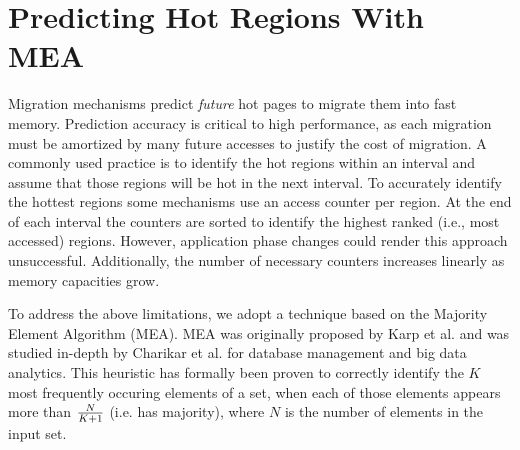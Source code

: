 
\section[Predicting Hot Regions With MEA]{Predicting Hot Regions With\\MEA}
\label{sec:MEA}


Migration mechanisms predict \textit{future} hot pages to migrate them into fast memory. Prediction accuracy is critical to high performance, as each migration must be amortized by many future accesses to justify the cost of migration.
A commonly used practice is to identify the hot regions within an interval 
and assume that those regions will be hot in the next interval. To accurately identify the hottest regions some mechanisms use an access counter per region. 
At the end of each interval the counters are sorted to identify the highest 
ranked (i.e., most accessed) regions. However, application phase changes could render this approach unsuccessful. Additionally, the number of necessary counters increases linearly as memory capacities grow.

To address the above limitations, we adopt a technique based on the Majority Element Algorithm (MEA). MEA was originally proposed by Karp et al. \cite{karp-mea} and was studied in-depth by Charikar et al. \cite{charikar-mea} for database management and big data analytics. This heuristic has formally been proven to correctly identify the $K$ most frequently occuring elements of a set, when each of those elements appears more than $N \over K+1$ (i.e. has majority), where $N$ is the number of elements in the input set. 


